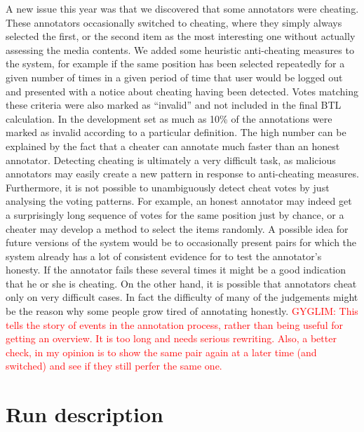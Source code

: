 \documentclass[sigconf]{acmart-me}
\begin{document}

A new issue this year was that we discovered that some annotators were cheating.
These annotators occasionally switched to cheating, where they simply always selected the first, or the second item as the most interesting one without actually assessing the media contents.
We added some heuristic anti-cheating measures to the system, for example if the same position has been selected repeatedly for a given number of times in a given period of time that user would be logged out and presented with a notice about cheating having been detected.
Votes matching these criteria were also marked as ``invalid'' and not included in the final BTL calculation.
In the development set as much as 10\% of the annotations were marked as invalid according to a particular definition.
The high number can be explained by the fact that a cheater can annotate much faster than an honest annotator.
Detecting cheating is ultimately a very difficult task, as malicious annotators may easily create a new pattern in response to anti-cheating measures.
Furthermore, it is not possible to unambiguously detect cheat votes by just analysing the voting patterns.  For example, an honest annotator may indeed get a surprisingly long sequence of votes for the same position just by chance, or a cheater may develop a method to select the items randomly.
A possible idea for future versions of the system would be to occasionally present pairs for which the system already has a lot of consistent evidence for to test the annotator's honesty.
If the annotator fails these several times it might be a good indication that he or she is cheating.
On the other hand, it is possible that annotators cheat only on very difficult cases.  In fact the difficulty of many of the judgements might be the reason why some people grow tired of annotating honestly.
\textcolor{red}{GYGLIM: This tells the story of events in the annotation process, rather than being useful for getting an overview. It is too long and needs serious rewriting.
Also, a better check, in my opinion is to show the same pair again at a later time (and switched) and see if they still perfer the same one.}


\section{Run description}
\end{document}
